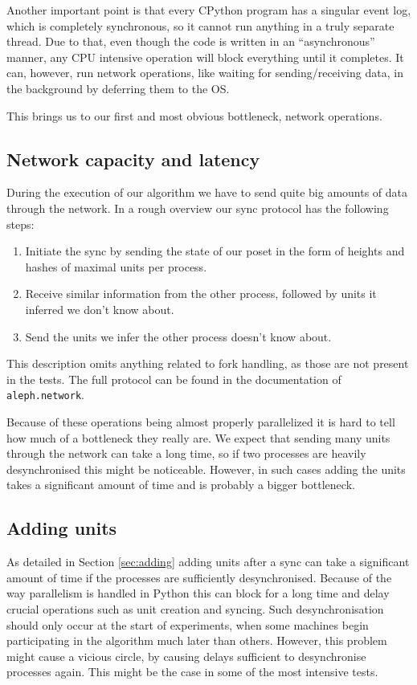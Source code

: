 \documentclass[a4paper,10pt]{article}
\begin{document}
		Another important point is that every CPython program has a singular event log, which is completely synchronous, so it cannot run anything in a truly separate thread.
		Due to that, even though the code is written in an ``asynchronous'' manner, any CPU intensive operation will block everything until it completes.
		It can, however, run network operations, like waiting for sending/receiving data, in the background by deferring them to the OS.

		This brings us to our first and most obvious bottleneck, network operations.
		\subsection{Network capacity and latency}
			During the execution of our algorithm we have to send quite big amounts of data through the network.
			In a rough overview our sync protocol has the following steps:
			\begin{enumerate}
				\item Initiate the sync by sending the state of our poset in the form of heights and hashes of maximal units per process.
				\item Receive similar information from the other process, followed by units it inferred we don't know about.
				\item Send the units we infer the other process doesn't know about.
			\end{enumerate}
			This description omits anything related to fork handling, as those are not present in the tests.
			The full protocol can be found in the documentation of \lstinline{aleph.network}.

			Because of these operations being almost properly parallelized it is hard to tell how much of a bottleneck they really are.
			We expect that sending many units through the network can take a long time, so if two processes are heavily desynchronised this might be noticeable.
			However, in such cases adding the units takes a significant amount of time and is probably a bigger bottleneck.
		\subsection{Adding units}
		 \label{ssec:addingUnits}
			As detailed in Section \ref{sec:adding} adding units after a sync can take a significant amount of time if the processes are sufficiently desynchronised.
			Because of the way parallelism is handled in Python this can block for a long time and delay crucial operations such as unit creation and syncing.
			Such desynchronisation should only occur at the start of experiments, when some machines begin participating in the algorithm much later than others.
			However, this problem might cause a vicious circle, by causing delays sufficient to desynchronise processes again.
			This might be the case in some of the most intensive tests.
\end{document}
